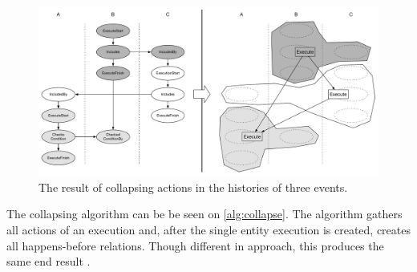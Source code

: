 	\begin{figure}[H]
		\centering
		\includegraphics[width=\textwidth]{6orderofexecution/images/transitive-example-collapse.pdf}
		\caption{The result of collapsing actions in the histories of three events.}
		\label{fig:orderofexecution:collapsing}
	\end{figure}
	
%	
%	
	
	\newpar The collapsing algorithm can be be seen on \ref{alg:collapse}. The algorithm gathers all actions of an execution and, after the single entity execution is created, creates all happens-before relations. Though different in approach, this produces the same end result .
	
